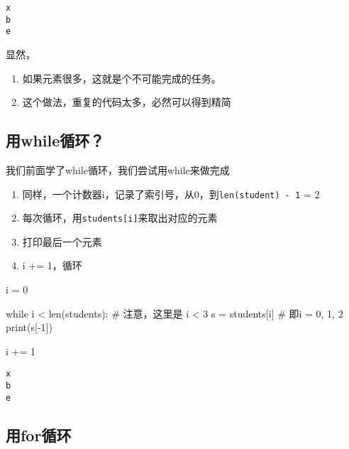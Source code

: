 \documentclass[
  letterpaper,
  DIV=11,
  numbers=noendperiod]{scrreprt}
\newenvironment{Shaded}{\begin{snugshade}}{\end{snugshade}}
\newcommand{\BuiltInTok}[1]{\textcolor[rgb]{0.00,0.23,0.31}{#1}}
\newcommand{\CommentTok}[1]{\textcolor[rgb]{0.37,0.37,0.37}{#1}}
\newcommand{\ControlFlowTok}[1]{\textcolor[rgb]{0.00,0.23,0.31}{#1}}
\newcommand{\DecValTok}[1]{\textcolor[rgb]{0.68,0.00,0.00}{#1}}
\newcommand{\NormalTok}[1]{\textcolor[rgb]{0.00,0.23,0.31}{#1}}
\newcommand{\OperatorTok}[1]{\textcolor[rgb]{0.37,0.37,0.37}{#1}}
\providecommand{\tightlist}{%
  \setlength{\itemsep}{0pt}\setlength{\parskip}{0pt}}\usepackage{longtable,booktabs,array}
\begin{document}
\begin{verbatim}
x
b
e
\end{verbatim}

显然，

\begin{enumerate}
\def\labelenumi{\arabic{enumi}.}
\tightlist
\item
  如果元素很多，这就是个不可能完成的任务。
\item
  这个做法，重复的代码太多，必然可以得到精简
\end{enumerate}

\hypertarget{ux7528whileux5faaux73af}{%
\subsection{用while循环？}\label{ux7528whileux5faaux73af}}

我们前面学了while循环，我们尝试用while来做完成

\begin{enumerate}
\def\labelenumi{\arabic{enumi}.}
\tightlist
\item
  同样，一个计数器i，记录了索引号，从0，到\texttt{len(student)\ -\ 1} =
  2
\item
  每次循环，用\texttt{students{[}i{]}}来取出对应的元素
\item
  打印最后一个元素
\item
  i += 1，循环
\end{enumerate}

\begin{Shaded}
\begin{Highlighting}[]
\NormalTok{i }\OperatorTok{=} \DecValTok{0}

\ControlFlowTok{while}\NormalTok{ i }\OperatorTok{\textless{}} \BuiltInTok{len}\NormalTok{(students): }\CommentTok{\# 注意，这里是 i \textless{} 3 }
\NormalTok{    s }\OperatorTok{=}\NormalTok{ students[i]        }\CommentTok{\# 即i = 0, 1, 2}
    \BuiltInTok{print}\NormalTok{(s[}\OperatorTok{{-}}\DecValTok{1}\NormalTok{])}
  
\NormalTok{    i }\OperatorTok{+=} \DecValTok{1}
\end{Highlighting}
\end{Shaded}

\begin{verbatim}
x
b
e
\end{verbatim}

\hypertarget{ux7528forux5faaux73af}{%
\subsection{用for循环}\label{ux7528forux5faaux73af}}
\end{document}
